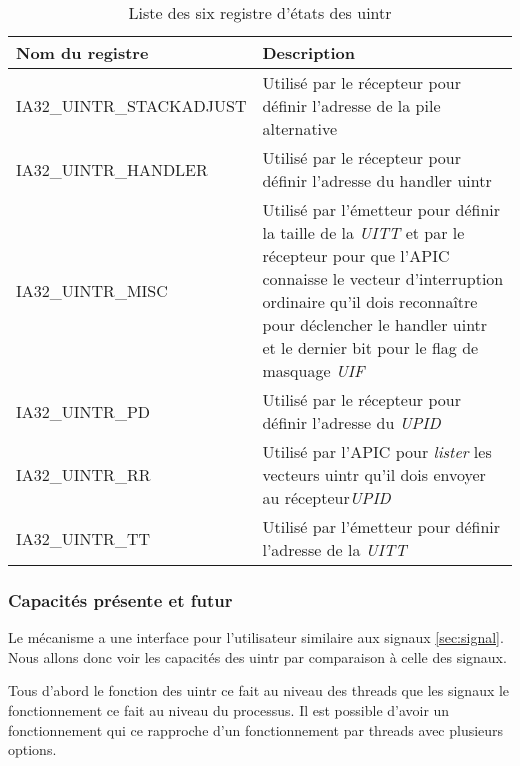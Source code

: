 \begin{table}[H]
  \centering
  \begin{tabular}{|p{}|p{}|}
    \hline
    \bf Nom du registre & \bf Description\\
    \hline
    IA32_UINTR_STACKADJUST & Utilisé par le récepteur pour définir l'adresse de la pile alternative\\ %
    \hline
    IA32_UINTR_HANDLER & Utilisé par le récepteur pour définir l'adresse du handler uintr\\
    \hline
    IA32_UINTR_MISC & Utilisé par l'émetteur pour définir la taille de la \emph{UITT} et
    par le récepteur pour que l'APIC connaisse le vecteur d'interruption ordinaire qu'il dois reconnaître pour déclencher le handler uintr
    et le dernier bit pour le flag de masquage \emph{UIF}\\
    \hline
    IA32_UINTR_PD & Utilisé par le récepteur pour définir l'adresse du \emph{UPID}\\
    \hline
    IA32_UINTR_RR & Utilisé par l'APIC pour \textit{lister} les vecteurs uintr qu'il dois envoyer au récepteur\emph{UPID}\\
    \hline
    IA32_UINTR_TT & Utilisé par l'émetteur pour définir l'adresse de la \emph{UITT}\\
    \hline
  \end{tabular}
  \caption{Liste des six registre d'états des uintr}
  \label{tab:uintrStateRegisters}
\end{table}


\subsubsection{Capacités présente et futur}

Le mécanisme a une interface pour l'utilisateur similaire aux signaux \ref{sec:signal}.
Nous allons donc voir les capacités des uintr par comparaison à celle des signaux.

Tous d'abord le fonction des uintr ce fait au niveau des threads que les signaux le fonctionnement ce fait au niveau du processus.
Il est possible d'avoir un fonctionnement qui ce rapproche d'un fonctionnement par threads avec plusieurs options.

